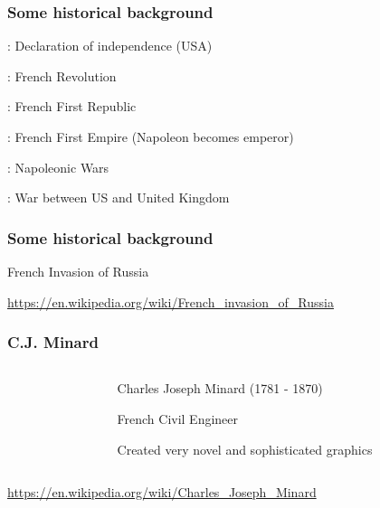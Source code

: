 \documentclass[12pt]{beamer}\usepackage[]{graphicx}\usepackage[]{color}
\begin{document}
\begin{frame}
\frametitle{Some historical background}

\bi
  \item {}: Declaration of independence (USA) 
  \item {}: French Revolution
  \item {}: French First Republic
  \item {}: French First Empire (Napoleon becomes emperor)
  \item {}: Napoleonic Wars
  \item {}: War between US and United Kingdom
\ei

\end{frame}


\begin{frame}
\frametitle{Some historical background}

{\Large French Invasion of Russia}

\vspace{1cm}

{\Large {}}

\vspace{1cm}

{\Large {}}

{\tiny \url{https://en.wikipedia.org/wiki/French_invasion_of_Russia}}

\end{frame}


\begin{frame}
\frametitle{C.J. Minard}

\begin{columns}[t]
\begin{column}{0.4\textwidth}
\begin{center}
\end{center}
\end{column}

\begin{column}{0.5\textwidth}
\begin{center}
\bi
  \item Charles Joseph Minard (1781 - 1870)
  \item French Civil Engineer
  \item Created very novel and sophisticated graphics
\ei
\end{center}
\end{column}
\end{columns}

\begin{center}
{\tiny \url{https://en.wikipedia.org/wiki/Charles_Joseph_Minard}}
\end{center}

\end{frame}
\end{document}
